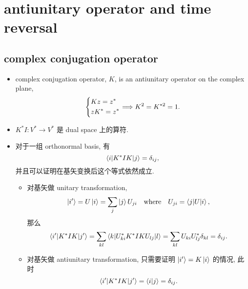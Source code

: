 \chapter{antiunitary operator and time reversal} \label{E}
\section{complex conjugation operator}
\begin{itemize}
	\item complex conjugation operator, $K$, is an antiunitary operator on the complex plane,
	\begin{equation}
		\begin{dcases}
			K z = z^* \\
			z K^* = z^*
		\end{dcases} \Longrightarrow K^2 = K^{* 2} = 1.
	\end{equation}
	
	\item $K^* I : V^* \rightarrow V^*$ 是 dual space 上的算符.
	
	\item 对于一组 orthonormal basis, 有
	\begin{equation}
		\braket{i | K^* I K | j} = \delta_{i j},
	\end{equation}
	并且可以证明在基矢变换后这个等式依然成立.
	
	\begin{tcolorbox}[title=proof:]
		\begin{itemize}
			\item 对基矢做 unitary transformation,
			\begin{equation}
				\ket{i'} = U \ket{i} = \sum_j \ket{j} U_{j i} \quad \text{where} \quad U_{j i} = \braket{j | U | i},
			\end{equation}
			那么
			\begin{equation}
				\braket{i' | K^* I K | j'} = \sum_{k l} \braket{k | U^*_{k i} K^* I K U_{l j} | l} = \sum_{k l} U_{k i} U^*_{l j} \delta_{k l} = \delta_{i j}.
			\end{equation}
			
			\item 对基矢做 antiunitary transformation, 只需要证明 $\ket{i'} = K \ket{i}$ 的情况, 此时
			\begin{equation}
				\braket{i' | K^* I K | j'} = \braket{i | j} = \delta_{i j}.
			\end{equation}
		\end{itemize}
	\end{tcolorbox}
\end{itemize}

